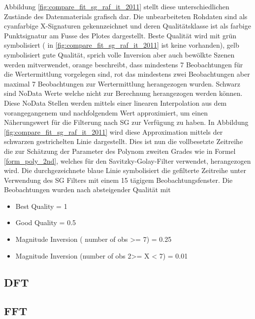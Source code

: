 \documentclass[11pt]{report}
\begin{document}
Abbildung \ref{fig:compare_fit_sg_raf_it_2011} stellt diese unterschiedlichen Zustände des Datenmaterials grafisch dar. Die unbearbeiteten Rohdaten sind als cyanfarbige X-Signaturen gekennzeichnet und deren Qualitätsklasse ist als farbige Punktsignatur am Fusse des Plotes dargestellt. Beste Qualität wird mit grün symbolisiert ( in \ref{fig:compare_fit_sg_raf_it_2011} ist keine vorhanden), gelb symbolisiert gute Qualität, sprich volle Inversion aber auch bewölkte Szenen werden mitverwendet,  orange beschreibt, dass mindestens 7 Beobachtungen für die Wertermittlung vorgelegen sind, rot das mindestens zwei Beobachtungen aber maximal 7 Beobachtungen zur Wertermittlung herangezogen wurden. Schwarz sind NoData Werte welche nicht zur Berechnung herangezogen werden können. Diese NoData Stellen werden mittels einer linearen Interpolation aus dem vorangegangenem und nachfolgendem Wert approximiert, um einen Näherungswert für die Filterung nach SG zur Verfügung zu haben. In Abbildung \ref{fig:compare_fit_sg_raf_it_2011} wird diese Approximation mittels der schwarzen gestrichelten Linie dargestellt. Dies ist nun die vollbesetzte Zeitreihe die zur Schätzung der Parameter des Polynom zweiten Grades wie in Formel \ref{form_poly_2nd}, welches für den Savitzky-Golay-Filter verwendet, herangezogen wird. Die durchgezeichnete blaue Linie symbolisiert die gefilterte Zeitreihe unter Verwendung des SG Filters mit einem 15 tägigem Beobachtungsfenster. Die Beobachtungen wurden nach absteigender Qualität mit 
\begin{itemize}
\item Best Quality = 1 
\item Good Quality = 0.5
\item Magnitude Inversion ( number of obs >= 7) = 0.25
\item Magnitude Inversion (number of obs 2>= X < 7) = 0.01
\end{itemize}


\subsection{DFT}
\subsection{FFT}
\end{document}
